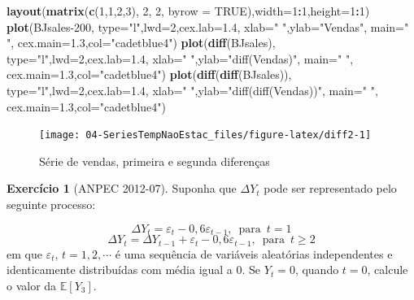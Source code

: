 \documentclass[
]{book}
\newenvironment{Shaded}{\begin{snugshade}}{\end{snugshade}}
\newcommand{\DataTypeTok}[1]{\textcolor[rgb]{0.13,0.29,0.53}{#1}}
\newcommand{\DecValTok}[1]{\textcolor[rgb]{0.00,0.00,0.81}{#1}}
\newcommand{\FloatTok}[1]{\textcolor[rgb]{0.00,0.00,0.81}{#1}}
\newcommand{\KeywordTok}[1]{\textcolor[rgb]{0.13,0.29,0.53}{\textbf{#1}}}
\newcommand{\NormalTok}[1]{#1}
\newcommand{\OperatorTok}[1]{\textcolor[rgb]{0.81,0.36,0.00}{\textbf{#1}}}
\newcommand{\OtherTok}[1]{\textcolor[rgb]{0.56,0.35,0.01}{#1}}
\newcommand{\StringTok}[1]{\textcolor[rgb]{0.31,0.60,0.02}{#1}}
\theoremstyle{definition}
\theoremstyle{definition}
\theoremstyle{definition}
\newtheorem{exercise}{Exercício}[chapter]
\theoremstyle{remark}
\begin{document}
\begin{Shaded}
\begin{Highlighting}[]
\KeywordTok{layout}\NormalTok{(}\KeywordTok{matrix}\NormalTok{(}\KeywordTok{c}\NormalTok{(}\DecValTok{1}\NormalTok{,}\DecValTok{1}\NormalTok{,}\DecValTok{2}\NormalTok{,}\DecValTok{3}\NormalTok{), }\DecValTok{2}\NormalTok{, }\DecValTok{2}\NormalTok{, }\DataTypeTok{byrow =} \OtherTok{TRUE}\NormalTok{),}\DataTypeTok{width=}\DecValTok{1}\OperatorTok{:}\DecValTok{1}\NormalTok{,}\DataTypeTok{height=}\DecValTok{1}\OperatorTok{:}\DecValTok{1}\NormalTok{)}
\KeywordTok{plot}\NormalTok{(BJsales}\DecValTok{-200}\NormalTok{, }\DataTypeTok{type=}\StringTok{"l"}\NormalTok{,}\DataTypeTok{lwd=}\DecValTok{2}\NormalTok{,}\DataTypeTok{cex.lab=}\FloatTok{1.4}\NormalTok{, }\DataTypeTok{xlab=}\StringTok{" "}\NormalTok{,}\DataTypeTok{ylab=}\StringTok{"Vendas"}\NormalTok{,  }\DataTypeTok{main=}\StringTok{" "}\NormalTok{, }\DataTypeTok{cex.main=}\FloatTok{1.3}\NormalTok{,}\DataTypeTok{col=}\StringTok{"cadetblue4"}\NormalTok{)}
\KeywordTok{plot}\NormalTok{(}\KeywordTok{diff}\NormalTok{(BJsales), }\DataTypeTok{type=}\StringTok{"l"}\NormalTok{,}\DataTypeTok{lwd=}\DecValTok{2}\NormalTok{,}\DataTypeTok{cex.lab=}\FloatTok{1.4}\NormalTok{, }\DataTypeTok{xlab=}\StringTok{" "}\NormalTok{,}\DataTypeTok{ylab=}\StringTok{"diff(Vendas)"}\NormalTok{,  }\DataTypeTok{main=}\StringTok{" "}\NormalTok{, }\DataTypeTok{cex.main=}\FloatTok{1.3}\NormalTok{,}\DataTypeTok{col=}\StringTok{"cadetblue4"}\NormalTok{)}
\KeywordTok{plot}\NormalTok{(}\KeywordTok{diff}\NormalTok{(}\KeywordTok{diff}\NormalTok{(BJsales)), }\DataTypeTok{type=}\StringTok{"l"}\NormalTok{,}\DataTypeTok{lwd=}\DecValTok{2}\NormalTok{,}\DataTypeTok{cex.lab=}\FloatTok{1.4}\NormalTok{, }\DataTypeTok{xlab=}\StringTok{" "}\NormalTok{,}\DataTypeTok{ylab=}\StringTok{"diff(diff(Vendas))"}\NormalTok{,  }\DataTypeTok{main=}\StringTok{" "}\NormalTok{, }\DataTypeTok{cex.main=}\FloatTok{1.3}\NormalTok{,}\DataTypeTok{col=}\StringTok{"cadetblue4"}\NormalTok{)}
\end{Highlighting}
\end{Shaded}

\begin{figure}
\texttt{[image: 04-SeriesTempNaoEstac\_files/figure-latex/diff2-1]} \caption{Série de vendas, primeira e segunda diferenças}\label{fig:diff2}
\end{figure}

\begin{exercise}[ANPEC 2012-07]
\protect\hypertarget{exr:an1207}{}{\label{exr:an1207} {} }Suponha que \(\Delta Y_t\) pode ser representado pelo seguinte processo:

\[\Delta Y_t=\varepsilon_t-0,6\varepsilon_{t-1},\,\,\,\mbox{para}\,\,\,t=1 \]
\[\Delta Y_t=\Delta Y_{t-1}+\varepsilon_t-0,6\varepsilon_{t-1},\,\,\,\mbox{para}\,\,\,t\geq 2 \]
em que \(\varepsilon_t\), \(t=1,2,\cdots\) é uma sequência de variáveis aleatórias independentes e identicamente distribuídas com média igual a 0. Se \(Y_t=0\), quando \(t=0\), calcule o valor da \(\mathbb{E}[Y_3]\).
\end{exercise}
\end{document}
